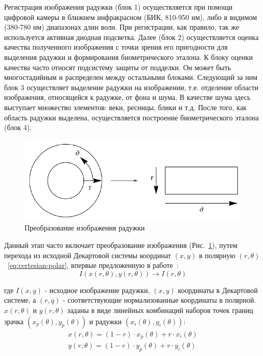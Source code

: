 Регистрация изображения радужки (блок 1) осуществляется при помощи цифровой камеры в ближнем инфракрасном (БИК, 810-950 нм), либо в видимом (380-780 нм) диапазонах длин волн. При регистрации, как правило, так же используется активная диодная подсветка. Далее (блок 2) осуществляется оценка качества полученного изображения с точки зрения его пригодности для выделения радужки и формирования биометрического эталона. К блоку оценки качества часто относят подсистему защиты от подделки. Он может быть многостадийным и распределен между остальными блоками. Следующий за ним блок 3 осуществляет выделение радужки на изображении, т.е. отделение области изображения, относящейся к радужке, от фона и шума. В качестве шума здесь выступает множество элементов: веки, ресницы, блики и т.д. После того, как область радужки выделена, осуществляется построение биометрического эталона (блок 4).

\begin{figure}[!h]
	\centering
	\includegraphics[width=0.5\columnwidth]{pictures/daugman-rubber-sheet.png}
	\caption{Преобразование изображения радужки}
	\label{fig:daugman_rubber_sheet}
\end{figure}

Данный этап часто включает преобразование изображения (Рис.~\ref{fig:daugman_rubber_sheet}), путем перехода из исходной Декартовой системы координат $(x,y)$ в полярную $(r,\theta)$~\eqref{eq:certesian-polar}, впервые предложенную в работе~\cite{daugman_1992}:
\begin{equation}\label{eq:certesian-polar}
	I(x(r, \theta), y(r, \theta)) \rightarrow I(r, \theta)
\end{equation}

\noindent
где $I(x,y)$ - исходное изображение радужки, $(x,y)$ координаты в Декартовой системе, а $(r,q)$ - соответствующие нормализованные координаты в полярной. $x(r,\theta)$ и $y(r,\theta)$ заданы в виде линейных комбинаций наборов точек границ зрачка $(x_p(\theta),y_p(\theta))$ и радужки $(x_i(\theta),y_i(\theta))$:
\begin{equation}\label{eq:certesian-polar2}
	\begin{split}
		x(r,\theta)=(1-r)\cdot x_p(\theta)+r\cdot x_i(\theta) \\
		y(r,\theta)=(1-r)\cdot y_p(\theta)+r\cdot y_i(\theta)
	\end{split}
\end{equation}

